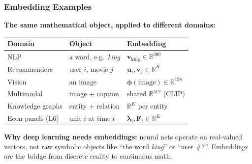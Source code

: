 \documentclass[notes,11pt, aspectratio=169]{beamer}
\newcommand{\vu}{\mathbf{u}}
\newcommand{\vv}{\mathbf{v}}
\newcommand{\vphi}{\boldsymbol{\phi}}
\newcommand{\R}{\mathbb{R}}
\begin{document}
\begin{frame}
\frametitle{Embedding Examples}

\textbf{The same mathematical object, applied to different domains:}

\vspace{8pt}
\begin{center}
\renewcommand{\arraystretch}{1.4}
\small
\begin{tabular}{p{3cm} p{4.5cm} p{5cm}}
\toprule
\textbf{Domain} & \textbf{Object} & \textbf{Embedding} \\
\midrule
NLP & a word, e.g.\ \textit{king} & $\vv_\text{king} \in \R^{300}$ \\
Recommenders & user $i$, movie $j$ & $\vu_i, \vv_j \in \R^{K}$ \\
Vision & an image & $\vphi(\text{image}) \in \R^{128}$ \\
Multimodal & image + caption & shared $\R^{512}$ (CLIP) \\
Knowledge graphs & entity + relation & $\R^K$ per entity \\
Econ panels (L6) & unit $i$ at time $t$ & $\boldsymbol\lambda_i, \mathbf{F}_t \in \R^K$ \\
\bottomrule
\end{tabular}
\end{center}

\vspace{12pt}

\vspace{6pt}
\textbf{Why deep learning needs embeddings:} neural nets operate on real-valued vectors, not raw symbolic objects like ``the word \textit{king}'' or ``user \#7''. Embeddings are the bridge from discrete reality to continuous math.
\end{frame}
\end{document}
